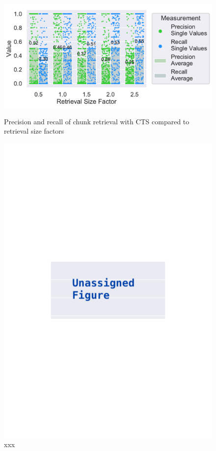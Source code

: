 \documentclass[\myrootdir/main.tex]{subfiles}
\begin{document}
\begin{figure}[htbp]
	\centering
	\begin{minipage}{0.45\textwidth}
		\centering
		\includegraphics[width=\textwidth, clip]{img/big-study/contextsizefactor-precision-recall-CTS.pdf}
		\caption{Precision and recall of chunk retrieval with CTS compared to retrieval size factors}
		\label{fig:contextsizefactor-precision-recall-CTS}
	\end{minipage}\hfill
	\begin{minipage}{0.45\textwidth}
		\centering
		\includegraphics[width=\textwidth, clip]{img/big-study/xxx.pdf}
		\caption{xxx}
		\label{fig:xxx}
	\end{minipage}
\end{figure}
\end{document}
